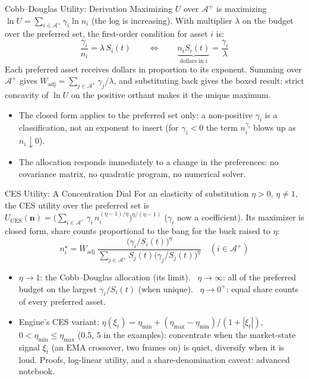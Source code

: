 \documentclass[aspectratio=169,11pt]{beamer}
\newcommand{\bn}{\mathbf{n}}
\newcommand{\Ap}{\mathcal{A}^{+}}
\newcommand{\Wadj}{W_{\mathrm{adj}}}
\begin{document}
\begin{frame}{Cobb--Douglas Utility: Derivation}
  Maximizing $U$ over $\Ap$ is maximizing $\ln U=\sum_{i\in\Ap}\gamma_i\ln n_i$
  (the log is increasing). With multiplier $\lambda$ on the budget over the
  preferred set, the first-order condition for asset $i$ is:
  \[
    \frac{\gamma_i}{n_i}=\lambda\,S_i(t)\qquad\Longleftrightarrow\qquad
    \underbrace{n_iS_i(t)}_{\text{dollars in }i}=\frac{\gamma_i}{\lambda}
  \]
  Each preferred asset receives dollars in proportion to its exponent. Summing
  over $\Ap$ gives $\Wadj=\sum_{j\in\Ap}\gamma_j/\lambda$, and substituting back
  gives the boxed result; strict concavity of $\ln U$ on the positive orthant
  makes it the unique maximum.
  \begin{itemize}\setlength{\itemsep}{0.35em}
    \item The closed form applies to the preferred set only: a non-positive
      $\gamma_i$ is a classification, not an exponent to insert (for $\gamma_i<0$
      the term $n_i^{\gamma_i}$ blows up as $n_i\downarrow0$).
    \item The allocation responds immediately to a change in the preferences: no
      covariance matrix, no quadratic program, no numerical solver.
  \end{itemize}
\end{frame}

\begin{frame}{CES Utility: A Concentration Dial}
  For an elasticity of substitution $\eta>0$, $\eta\ne1$, the CES utility over the
  preferred set is $U_{\mathrm{CES}}(\bn)=\bigl(\sum_{i\in\Ap}\gamma_i\,n_i^{(\eta-1)/\eta}\bigr)^{\eta/(\eta-1)}$
  ($\gamma_i$ now a coefficient). Its maximizer is closed form, share counts
  proportional to the bang for the buck raised to $\eta$:
  \[
    \boxed{n_i^\star=\Wadj\;\frac{\bigl(\gamma_i/S_i(t)\bigr)^{\eta}}
      {\sum_{j\in\Ap}S_j(t)\bigl(\gamma_j/S_j(t)\bigr)^{\eta}}\quad(i\in\Ap)}
  \]
  \begin{itemize}\setlength{\itemsep}{0.3em}
    \item $\eta\to1$: the Cobb--Douglas allocation (its limit). \ $\eta\to\infty$:
      all of the preferred budget on the largest $\gamma_i/S_i(t)$ (when unique).
      \ $\eta\to0^+$: equal share counts of every preferred asset.
    \item Engine's CES variant: $\eta(\xi_t)=\eta_{\min}+(\eta_{\max}-\eta_{\min})/(1+|\xi_t|)$,
      $0<\eta_{\min}\le\eta_{\max}$ ($0.5$, $5$ in the examples): concentrate when
      the market-state signal $\xi_t$ (an EMA crossover, two frames on) is quiet,
      diversify when it is loud.
      Proofs, log-linear utility, and a share-denomination caveat: advanced notebook.
  \end{itemize}
\end{frame}
\end{document}
